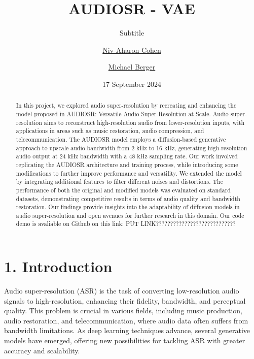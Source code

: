 \documentclass[
  ]{scrartcl}
\title{AUDIOSR - VAE}
\subtitle{Subtitle}
\author{\href{mailto:nivcohen1000@gmail.com}{Niv Aharon
Cohen} \and \href{mailto:michael.berger.e@gmail.com}{Michael Berger}}
\date{17 September 2024}
\begin{document}
\maketitle
\begin{abstract}
In this project, we explored audio super-resolution by recreating and
enhancing the model proposed in AUDIOSR: Versatile Audio
Super-Resolution at Scale. Audio super-resolution aims to reconstruct
high-resolution audio from lower-resolution inputs, with applications in
areas such as music restoration, audio compression, and
telecommunication. The AUDIOSR model employs a diffusion-based
generative approach to upscale audio bandwidth from 2 kHz to 16 kHz,
generating high-resolution audio output at 24 kHz bandwidth with a 48
kHz sampling rate. Our work involved replicating the AUDIOSR
architecture and training process, while introducing some modifications
to further improve performance and versatility. We extended the model by
integrating additional features to filter different noises and
distortions. The performance of both the original and modified models
was evaluated on standard datasets, demonstrating competitive results in
terms of audio quality and bandwidth restoration. Our findings provide
insights into the adaptability of diffusion models in audio
super-resolution and open avenues for further research in this domain.
Our code demo is avaliable on Github on this link: PUT
LINK????????????????????????????
\end{abstract}



\renewcommand*\contentsname{Contents}
{
\setcounter{tocdepth}{1}
\tableofcontents
}
\listoffigures
\section{1. Introduction}\label{introduction}

Audio super-resolution (ASR) is the task of converting low-resolution
audio signals to high-resolution, enhancing their fidelity, bandwidth,
and perceptual quality. This problem is crucial in various fields,
including music production, audio restoration, and telecommunication,
where audio data often suffers from bandwidth limitations. As deep
learning techniques advance, several generative models have emerged,
offering new possibilities for tackling ASR with greater accuracy and
scalability.
\end{document}
